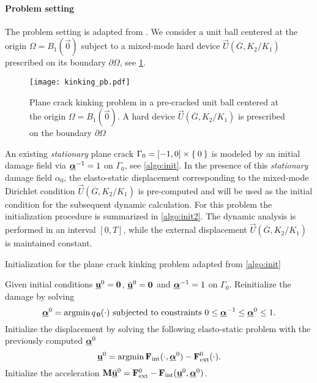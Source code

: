 \paragraph{Problem setting} The problem setting is adapted from \cite{HakimKarma:2005,HakimKarma:2009}. We consider a unit ball centered at the origin $\Omega=B_1(\vec{0})$ subject to a mixed-mode hard device $\vec{U}(\overline{G},K_2/K_1)$ prescribed on its boundary $\partial\Omega$, see \cref{fig:kinking}.
\begin{figure}[htbp]
\centering
\texttt{[image: kinking\_pb.pdf]}
\caption{Plane crack kinking problem in a pre-cracked unit ball centered at the origin $\Omega=B_1(\vec{0})$. A hard device $\vec{U}(\overline{G},K_2/K_1)$ is prescribed on the boundary $\partial\Omega$} \label{fig:kinking}
\end{figure}
An existing \emph{stationary} plane crack $\Gamma_0=[-1,0]\times\Set{0}$ is modeled by an initial damage field via $\dvec^{-1}=1$ on $\Gamma_0$, see \cref{algo:init}. In the presence of this \emph{stationary} damage field $\alpha_0$, the elasto-static displacement corresponding to the mixed-mode Dirichlet condition $\vec{U}(\overline{G},K_2/K_1)$ is pre-computed and will be used as the initial condition for the subsequent dynamic calculation. For this problem the initialization procedure is summarized in \cref{algo:init2}. The dynamic analysis is performed in an interval $[0,T]$, while the external displacement $\vec{U}(\overline{G},K_2/K_1)$ is maintained constant.
\begin{algorithm}[htbp]
\caption{Initialization for the plane crack kinking problem adapted from \cref{algo:init}} \label{algo:init2}
\begin{algorithmic}[1]\linespread{1.2}\selectfont\normalsize
\State Given initial conditions $\uvec^0=\vec{0}$, $\dot{\uvec}^0=\vec{0}$ and $\dvec^{-1}=1$ on $\Gamma_0$.
\State Reinitialize the damage by solving
\[
\dvec^0=\operatorname{arg min}q_{\,\vec{0}}(\cdot)\text{ subjected to constraints $0\leq\dvec^{-1}\leq\dvec^0\leq 1$}.
\]
\State Initialize the displacement by solving the following elasto-static problem with the previously computed $\dvec^0$
\[
\uvec^0=\operatorname{arg min}\vec{F}_\mathrm{int}(\cdot,\dvec^0)-\vec{F}_\mathrm{ext}^0(\cdot).
\]
\State Initialize the acceleration $\vec{M}\ddot{\uvec}^0=\vec{F}_\mathrm{ext}^0-\vec{F}_\mathrm{int}(\uvec^0,\dvec^0)$.
\end{algorithmic}
\end{algorithm}

